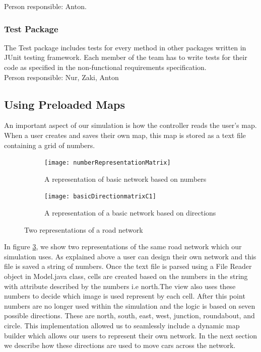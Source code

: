 \documentclass{article}
\begin{document}
	\noindent
	Person responsible: Anton.
	
	\subsubsection{Test Package}
	The Test package includes tests for every method in other packages written in JUnit testing framework. 
	Each member of the team has to write  tests for their code as specified in the non-functional requirements specification.\\
	
	\noindent
	Person responsible: Nur, Zaki, Anton


\subsection{Using Preloaded Maps}
	
An important aspect of our simulation is how the controller reads the user's map. When a user creates and saves their own map, this map is stored as a text file containing a grid of numbers. \\


	\begin{figure}[H]
		\centering
		
		\begin{subfigure}{0.45\textwidth}
			\centering
			\texttt{[image: numberRepresentationMatrix]}
			\caption{A representation of basic network based on numbers}
			\label{NumberRepresentation}
		\end{subfigure}
		\qquad
		\begin{subfigure}{0.45\textwidth}
			\centering
			\texttt{[image: basicDirectionmatrixC1]}
			\caption{A representation of a basic network based on directions}
			\label{DirectionRepresentation}
		\end{subfigure}
		\caption{Two representations of a road network}
		\label{StringNetworks}
	\end{figure}
	

In figure \ref{StringNetworks}, we show two representations of the same road network which our simulation uses. As explained above a user can design their own network and this file is saved a string of numbers. Once the text file is parsed using a File Reader object in Model.java class, cells are created based on the numbers in the string with attribute described by the numbers i.e north.The view also uses these numbers to decide which image is used represent by each cell. After this point numbers are no longer used within the simulation and the logic is based on seven possible directions. These are north, south, east, west, junction, roundabout, and circle. This implementation allowed us to seamlessly include a dynamic map builder which allows our users to represent their own network. In the next section we describe how these directions are used to move cars across the network. 
\end{document}
